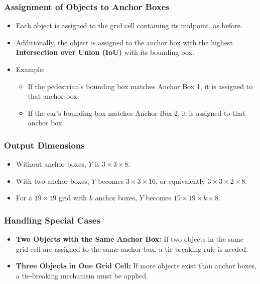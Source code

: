 \documentclass[letterpaper,12pt,notitlepage,twoside]{report}
\begin{document}
\subsubsection*{Assignment of Objects to Anchor Boxes}
\begin{itemize}
    \item Each object is assigned to the grid cell containing its midpoint, as before.
    \item Additionally, the object is assigned to the anchor box with the highest \textbf{Intersection over Union (IoU)} with its bounding box.
    \item Example:
    \begin{itemize}
        \item If the pedestrian's bounding box matches Anchor Box 1, it is assigned to that anchor box.
        \item If the car's bounding box matches Anchor Box 2, it is assigned to that anchor box.
    \end{itemize}
\end{itemize}

\subsubsection*{Output Dimensions}
\begin{itemize}
    \item Without anchor boxes, $Y$ is $3 \times 3 \times 8$.
    \item With two anchor boxes, $Y$ becomes $3 \times 3 \times 16$, or equivalently $3 \times 3 \times 2 \times 8$.
    \item For a $19 \times 19$ grid with $k$ anchor boxes, $Y$ becomes $19 \times 19 \times k \times 8$.
\end{itemize}

\subsubsection*{Handling Special Cases}
\begin{itemize}
    \item \textbf{Two Objects with the Same Anchor Box:} If two objects in the same grid cell are assigned to the same anchor box, a tie-breaking rule is needed.
    \item \textbf{Three Objects in One Grid Cell:} If more objects exist than anchor boxes, a tie-breaking mechanism must be applied.
\end{itemize}
\end{document}
